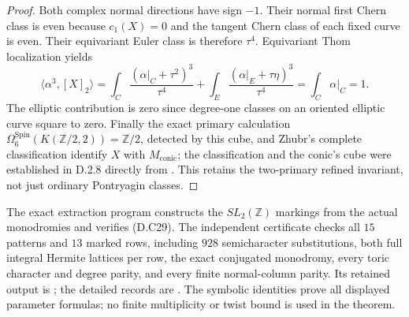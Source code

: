 \begin{proof}
Both complex normal directions have sign $-1$. Their normal first
Chern class is even because $c_1(X)=0$ and the tangent Chern class of
each fixed curve is even. Their equivariant Euler class is therefore
$\tau^4$. Equivariant Thom localization yields
\[
 \langle\alpha^3,[X]_2\rangle
 =\int_C\frac{(\alpha|_C+\tau^2)^3}{\tau^4}
  +\int_E\frac{(\alpha|_E+\tau\eta)^3}{\tau^4}
 =\int_C\alpha|_C=1.
\]
The elliptic contribution is zero since degree-one classes on an
oriented elliptic curve square to zero. Finally the exact primary
calculation
$\Omega^{\mathrm{Spin}}_6(K(\mathbb Z/2,2))=\mathbb Z/2$,
detected by this cube, and Zhubr's complete classification identify
$X$ with $M_{\mathrm{conic}}$; the classification and the conic's cube
were established in D.2.8 directly from
\cite[Theorems 3, 2.10 and Section 3.12]{manZhubr75}.
This retains the two-primary refined invariant, not just ordinary
Pontryagin classes.
\end{proof}

The exact extraction program 
constructs the $SL_2(\mathbb Z)$ markings from the actual monodromies
and verifies (D.C29). The independent certificate
checks all $15$ patterns and $13$ marked rows, including $928$
semicharacter substitutions, both full integral Hermite lattices per
row, the exact conjugated monodromy, every toric character and degree
parity, and every finite normal-column parity. Its retained output is
; the detailed records are
. The symbolic identities prove
all displayed parameter formulas; no finite multiplicity or twist
bound is used in the theorem.
